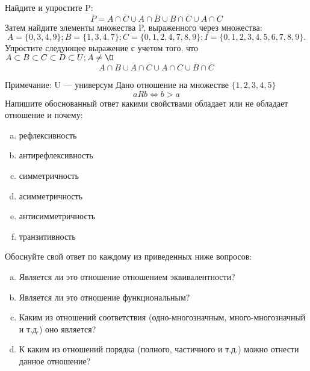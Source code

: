 \documentclass[10pt]{exam}
\begin{document}
\begin{questions}
\question
Найдите и упростите P:
\begin{equation*}
\overline{P} = A \cap \overline{C} \cup A \cap \overline{B} \cup B \cap \overline{C} \cup A \cap C
\end{equation*}
Затем найдите элементы множества P, выраженного через множества:
\begin{equation*}
A = \{0, 3, 4, 9\}; 
B = \{1, 3, 4, 7\};
C = \{0, 1, 2, 4, 7, 8, 9\};
I = \{0, 1, 2, 3, 4, 5, 6, 7, 8, 9\}.
\end{equation*}\question
Упростите следующее выражение с учетом того, что $A\subset B \subset C \subset D \subset U; A \neq \O$
\begin{equation*}
A \cap B \cup \overline{A} \cap \overline{C} \cup A \cap C \cup \overline{B} \cap \overline{C}
\end{equation*}

Примечание: U — универсум\question
Дано отношение на множестве $\{1, 2, 3, 4, 5\}$ 
\begin{equation*}
aRb \iff b > a
\end{equation*}
Напишите обоснованный ответ какими свойствами обладает или не обладает отношение и почему:   
\begin{enumerate} [a)]\setcounter{enumi}{0}
\item рефлексивность
\item антирефлексивность
\item симметричность
\item асимметричность
\item антисимметричность
\item транзитивность
\end{enumerate}

Обоснуйте свой ответ по каждому из приведенных ниже вопросов:
\begin{enumerate} [a)]\setcounter{enumi}{0}
    \item Является ли это отношение отношением эквивалентности?
    \item Является ли это отношение функциональным?
    \item Каким из отношений соответствия (одно-многозначным, много-многозначный и т.д.) оно является?
    \item К каким из отношений порядка (полного, частичного и т.д.) можно отнести данное отношение?
\end{enumerate}


\end{questions}
\end{document}
